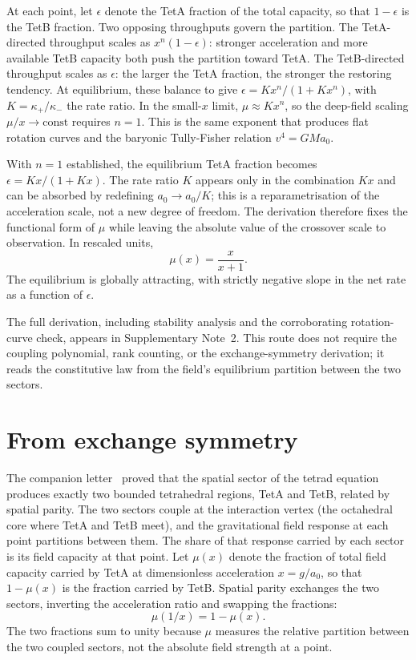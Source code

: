 \documentclass[twocolumn]{iopjournal}
\begin{document}
At each point, let $\epsilon$ denote the TetA fraction of the
total capacity, so that $1 - \epsilon$ is the TetB fraction.
Two opposing throughputs govern the partition. The
TetA-directed throughput scales as $x^n(1 - \epsilon)$:
stronger acceleration and more available TetB capacity both
push the partition toward TetA. The TetB-directed throughput
scales as $\epsilon$: the larger the TetA fraction, the
stronger the restoring tendency. At equilibrium, these balance
to give
$\epsilon = Kx^n / (1 + Kx^n)$, with $K = \kappa_+/\kappa_-$
the rate ratio. In the small-$x$ limit, $\mu \approx Kx^n$,
so the deep-field scaling $\mu/x \to \text{const}$ requires
$n = 1$. This is the same exponent that produces flat rotation
curves and the baryonic Tully-Fisher relation $v^4 = GMa_0$.

With $n = 1$ established, the equilibrium TetA fraction becomes
$\epsilon = Kx/(1 + Kx)$. The rate ratio $K$ appears only in
the combination $Kx$ and can be absorbed by redefining
$a_0 \to a_0/K$; this is a reparametrisation of the
acceleration scale, not a new degree of freedom. The derivation
therefore fixes the functional form of $\mu$ while leaving the
absolute value of the crossover scale to observation. In
rescaled units,
\begin{equation}
  \mu(x) = \frac{x}{x + 1}.
  \label{eq:mu_eq}
\end{equation}
The equilibrium is globally attracting, with strictly negative
slope in the net rate as a function of $\epsilon$.

The full derivation, including stability analysis and the
corroborating rotation-curve check, appears in
Supplementary Note~2. This route does not
require the coupling polynomial, rank counting, or the
exchange-symmetry derivation; it reads the constitutive law
from the field's equilibrium partition between the two sectors.


\section{From exchange symmetry}
\label{sec:route3}

The companion letter~\cite{Nelson2026a} proved that the spatial
sector of the tetrad equation produces exactly two bounded
tetrahedral regions, TetA and TetB, related by spatial parity.
The two sectors couple at the interaction vertex (the
octahedral core where TetA and TetB meet), and the
gravitational field response at each point partitions between
them. The share of that response carried by each sector is its
field capacity at that point.
Let $\mu(x)$ denote the fraction of total field capacity carried
by TetA at dimensionless acceleration $x = g/a_0$, so that
$1 - \mu(x)$ is the fraction carried by TetB. Spatial parity
exchanges the two sectors, inverting the acceleration ratio and
swapping the fractions:
\begin{equation}
  \mu(1/x) = 1 - \mu(x).
  \label{eq:duality}
\end{equation}
The two fractions sum to unity because $\mu$ measures the
relative partition between the two coupled sectors, not the
absolute field strength at a point.
\end{document}
